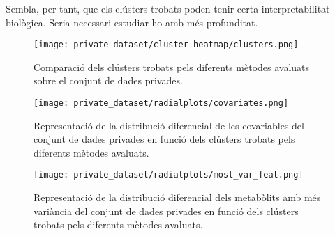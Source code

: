 \documentclass[CAT,BIB]{TFUOC}%
\begin{document}
        Sembla, per tant, que els clústers trobats poden tenir certa interpretabilitat biològica.
        Seria necessari estudiar-ho amb més profunditat.



        \begin{figure}[p]
            \centering
            \texttt{[image: private\_dataset/cluster\_heatmap/clusters.png]}
            \caption[Comparació dels clústers pel conjunt de dades DCH-NG]{
                Comparació dels clústers trobats pels diferents mètodes avaluats
                sobre el conjunt de dades \gls{privades}.
            }
            \label{f:dchng_heatmap}
        \end{figure}

        \begin{figure}[p]
            \centering
            \texttt{[image: private\_dataset/radialplots/covariates.png]}
            \caption[Distribució diferencial de les covariables a DCH-NG]{
                Representació de la distribució diferencial
                de les covariables del conjunt de dades \gls{privades}
                en funció dels clústers trobats pels diferents mètodes avaluats.
            }
            \label{f:dchng_radial_covars}
        \end{figure}

        \begin{figure}[p]
            \centering
            \texttt{[image: private\_dataset/radialplots/most\_var\_feat.png]}
            \caption[Distribució diferencial dels 20 metabòlits amb més variància a DCH-NG]{
                Representació de la distribució diferencial
                dels metabòlits amb més variància del conjunt de dades \gls{privades}
                en funció dels clústers trobats pels diferents mètodes avaluats.
            }
            \label{f:dchng_radial_mostvar}
        \end{figure}
\end{document}

